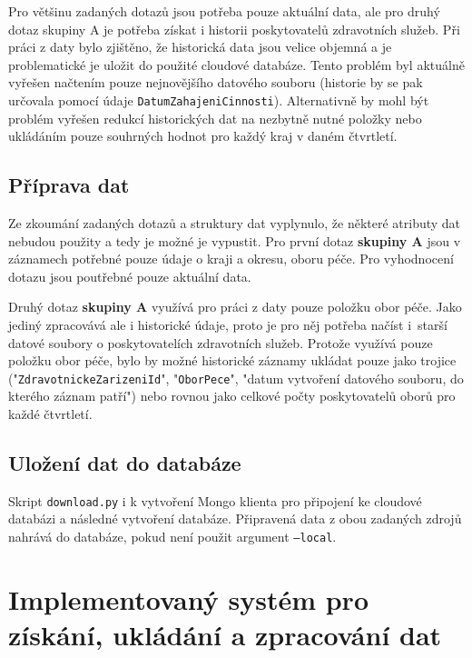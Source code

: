 \documentclass[11pt, a4paper]{article}
\theoremstyle{definition}
\theoremstyle{plain}
\begin{document}
Pro většinu zadaných dotazů jsou potřeba pouze aktuální data, ale pro druhý dotaz skupiny A je potřeba získat i historii poskytovatelů zdravotních služeb. Při práci z daty bylo zjištěno, že historická data jsou velice objemná a je problematické je uložit do použité cloudové databáze. Tento problém byl aktuálně vyřešen načtením pouze nejnovějšího datového souboru (historie by se pak určovala pomocí údaje \texttt{DatumZahajeniCinnosti}). Alternativně by mohl být problém vyřešen redukcí historických dat na nezbytně nutné položky nebo ukládáním pouze souhrných hodnot pro každý kraj v daném čtvrtletí.

\subsection{Příprava dat}
Ze zkoumání zadaných dotazů a struktury dat vyplynulo, že některé atributy dat nebudou použity a tedy je možné je vypustit. Pro první dotaz \textbf{skupiny A} jsou v záznamech potřebné pouze údaje o kraji a okresu, oboru péče. Pro vyhodnocení dotazu jsou poutřebné pouze aktuální data.

Druhý dotaz \textbf{skupiny A} využívá pro práci z daty pouze položku obor péče. Jako jediný zpracovává ale i historické údaje, proto je pro něj potřeba načíst i~starší datové soubory o poskytovatelích zdravotních služeb. Protože využívá pouze položku obor péče, bylo by možné historické záznamy ukládat pouze jako trojice ("\texttt{ZdravotnickeZarizeniId}", "\texttt{OborPece}", "datum vytvoření datového souboru, do kterého záznam patří") nebo rovnou jako celkové počty poskytovatelů oborů pro každé čtvrtletí.



\subsection{Uložení dat do databáze}
Skript \texttt{download.py} i k vytvoření Mongo klienta pro připojení ke cloudové databázi a následné vytvoření databáze. Připravená data z obou zadaných zdrojů nahrává do databáze, pokud není použit argument \texttt{--local}. 

\section{Implementovaný systém pro získání, ukládání a zpracování dat}
\end{document}
